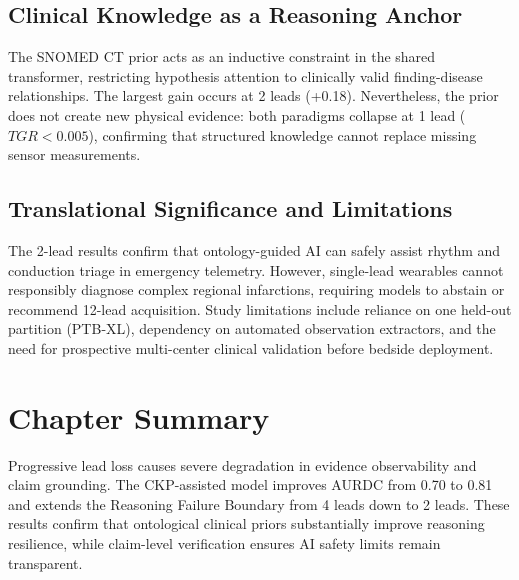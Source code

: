 \documentclass{ssnreview}
\begin{document}
\subsection{Clinical Knowledge as a Reasoning Anchor}
The SNOMED CT prior acts as an inductive constraint in the shared transformer, restricting
hypothesis attention to clinically valid finding-disease relationships. The largest gain occurs
at 2 leads (+0.18). Nevertheless, the prior does not create new physical evidence: both paradigms
collapse at 1 lead ($TGR < 0.005$), confirming that structured knowledge cannot replace missing
sensor measurements.

\subsection{Translational Significance and Limitations}
The 2-lead results confirm that ontology-guided AI can safely assist rhythm and conduction triage
in emergency telemetry. However, single-lead wearables cannot responsibly diagnose complex
regional infarctions, requiring models to abstain or recommend 12-lead acquisition. Study
limitations include reliance on one held-out partition (PTB-XL), dependency on automated
observation extractors, and the need for prospective multi-center clinical validation before
bedside deployment.

\section{Chapter Summary}
Progressive lead loss causes severe degradation in evidence observability and claim grounding.
The CKP-assisted model improves AURDC from 0.70 to 0.81 and extends the Reasoning Failure
Boundary from 4 leads down to 2 leads. These results confirm that ontological clinical priors
substantially improve reasoning resilience, while claim-level verification ensures AI safety
limits remain transparent.
\end{document}
